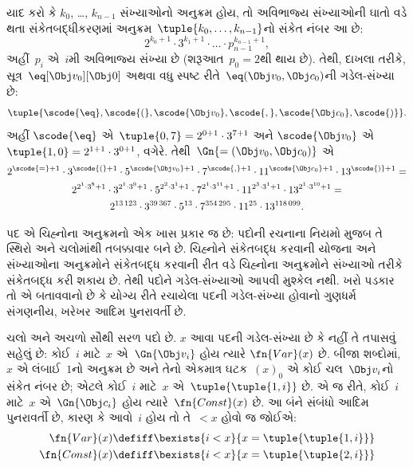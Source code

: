 \begin{ex}
યાદ કરો કે $k_0$, \dots, $k_{n-1}$
સંખ્યાઓનો અનુક્રમ હોય, તો અવિભાજ્ય
સંખ્યાઓની ઘાતો વડે થતા સંકેતબદ્ધીકરણમાં
અનુક્રમ~$\tuple{k_0, \dots, k_{n-1}}$નો
સંકેત નંબર આ છે:
\[
2^{k_0+1}\cdot3^{k_1+1}\cdot \dots \cdot p_{n-1}^{k_{n-1}+1},
\]
અહીં~$p_i$ એ~$i$મી અવિભાજ્ય સંખ્યા છે
(શરૂઆત~$p_0 = 2$થી થાય છે). તેથી,
દાખલા તરીકે, સૂત્ર~$\eq[\Obj v_0][\Obj 0]$
અથવા વધુ સ્પષ્ટ રીતે~${\eq}(\Obj v_0,\Obj c_0)$ની
ગડેલ-સંખ્યા છે:
\[
\tuple{\scode{\eq},\scode{(},\scode{\Obj v_0},\scode{,}, \scode{\Obj
    c_0},\scode{)}}.
\]
અહીં $\scode{\eq}$ એ~$\tuple{0,7} = 2^{0+1}\cdot
3^{7+1}$ અને $\scode{\Obj v_0}$ એ~$\tuple{1,0} = 2^{1+1}\cdot3^{0+1}$,
વગેરે. તેથી~$\Gn{=(\Obj v_0,\Obj c_0)}$ એ
\begin{multline*}
2^{\scode{=} + 1}\cdot 3^{\scode{(}+1}\cdot 5^{\scode{\Obj v_0}+1}
\cdot 7^{\scode{,} + 1} \cdot 11^{\scode{\Obj c_0}+1} \cdot
13^{\scode{)}+1} = \\
2^{2^1\cdot 3^8 + 1}\cdot 3^{2^1\cdot 3^9+1}\cdot 5^{2^2\cdot 3^1+1}
\cdot 7^{2^1\cdot 3^{11} + 1} \cdot 11^{2^3\cdot3^1+1} \cdot
13^{2^1\cdot3^{10}+1} = \\
2^{13\,123}\cdot 3^{39\,367}\cdot 5^{13}\cdot 7^{354\,295}\cdot11^{25}\cdot13^{118\,099}.
\end{multline*}
\end{ex}
\endgroup


\begingroup
\makeatletter{}\makeatother

\label{guunit:OLP-0283}


\begin{explain}
પદ એ ચિહ્નોના અનુક્રમનો એક ખાસ પ્રકાર
જ છે: પદોની રચનાના નિયમો મુજબ તે
સ્થિરો અને ચલોમાંથી તબક્કાવાર
બને છે. ચિહ્નોને સંકેતબદ્ધ કરવાની યોજના
અને સંખ્યાઓના અનુક્રમોને સંકેતબદ્ધ કરવાની
રીત વડે ચિહ્નોના અનુક્રમોને સંખ્યાઓ તરીકે
સંકેતબદ્ધ કરી શકાય છે. તેથી પદોને
ગડેલ-સંખ્યાઓ આપવી મુશ્કેલ નથી.
ખરો પડકાર તો એ બતાવવાનો છે કે
યોગ્ય રીતે રચાયેલા પદની ગડેલ-સંખ્યા
હોવાનો ગુણધર્મ સંગણનીય, ખરેખર આદિમ
પુનરાવર્તી છે.
\end{explain}

ચલો અને અચળો સૌથી
સરળ પદો છે. $x$ આવા પદની ગડેલ-સંખ્યા
છે કે નહીં તે તપાસવું સહેલું છે:
કોઈ~$i$ માટે~$x$ એ~$\Gn{\Obj v_i}$
હોય ત્યારે $\fn{Var}(x)$ છે. બીજા
શબ્દોમાં, $x$ એ લંબાઈ~$1$નો અનુક્રમ છે
અને તેનો એકમાત્ર ઘટક~$(x)_0$ એ
કોઈ ચલ~$\Obj v_i$નો સંકેત
નંબર છે; એટલે કોઈ~$i$ માટે~$x$
એ~$\tuple{\tuple{1, i}}$ છે. એ જ રીતે,
કોઈ~$i$ માટે~$x$ એ~$\Gn{\Obj c_i}$
હોય ત્યારે~$\fn{Const}(x)$ છે. આ
બંને સંબંધો આદિમ પુનરાવર્તી છે, કારણ કે
આવો~$i$ હોય તો તે~$< x$ હોવો જ
જોઈએ:
\begin{align*}
  \fn{Var}(x) & \defiff \bexists{i<x}{x = \tuple{\tuple{1, i}}}\\
  \fn{Const}(x) & \defiff \bexists{i<x}{x = \tuple{\tuple{2, i}}}
\end{align*}

